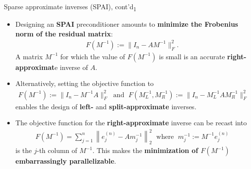 \documentclass[t,usepdftitle=false]{beamer}
\begin{document}
\begin{frame}{Sparse approximate inverses (SPAI), cont'd\textsubscript{1}}
\begin{itemize}
\item Designing an \textbf{SPAI} preconditioner amounts to \textbf{minimize the Frobenius norm of the residual matrix}:
\begin{align*}
F(M^{-1}):=\|I_n-AM^{-1}\|_F^2.
\end{align*} 
A matrix $M^{-1}$ for which the value of $F(M^{-1})$ is small is an accurate \textbf{right-approximat}e inverse of $A$.
\item[] Alternatively, setting the objective function to
\begin{align*}
F(M^{-1}):=\|I_n-M^{-1}A\|_F^2
\;\text{ and }\;
F(M_L^{-1},M_R^{-1}):=\|I_n-M_L^{-1}AM_R^{-1}\|_F^2
\end{align*}
enables the design of \textbf{left-} and \textbf{split-approximate} inverses.
\item The objective function for the \textbf{right-approximate} inverse can be recast into
\begin{align*}
F(M^{-1})=\sum_{j=1}^n\left\|e_j^{(n)}-Am_j^{-1}\right\|_2^2
\;\text{ where }\;
m_j^{-1}:=M^{-1}e_j^{(n)}
\end{align*}
is the $j$-th column of $M^{-1}$.
This makes the \textbf{minimization of $F(M^{-1})$ embarrassingly parallelizable}.
\end{itemize}
\end{frame}
\end{document}
